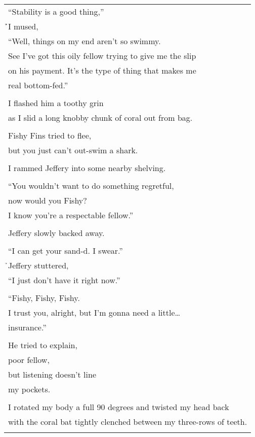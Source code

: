 \documentclass{article}
\begin{document}
\begin{center}
\begin{tabular}{l}
``Stability is a good thing,'' \\
\h\h{}I mused, \\
``Well, things on my end aren't so swimmy. \\
See I've got this oily fellow trying to give me the slip \\
on his payment.  It's the type of thing that makes me \\
real bottom-fed.'' \\
\\
I flashed him a toothy grin \\
as I slid a long knobby chunk of coral out from bag. \\
\\
Fishy Fins tried to flee, \\
but you just can't out-swim a shark. \\
\\
I rammed Jeffery into some nearby shelving. \\
\\
``You wouldn't want to do something regretful, \\
now would you Fishy? \\
I know you're a respectable fellow.'' \\
\\
Jeffery slowly backed away. \\
\\
``I can get your sand-d. I swear.'' \\
\h{}Jeffery stuttered, \\
``I just don't have it right now.'' \\
\\
``Fishy, Fishy, Fishy. \\
I trust you, alright, but I'm gonna need a little\ldots{} \\
insurance.'' \\
\\
He tried to explain, \\
poor fellow, \\
but listening doesn't line \\
my pockets. \\
\\
I rotated my body a full 90 degrees and twisted my head back \\
with the coral bat tightly clenched between my three-rows of teeth. \\
\\

\end{tabular}
\end{center}
\end{document}
